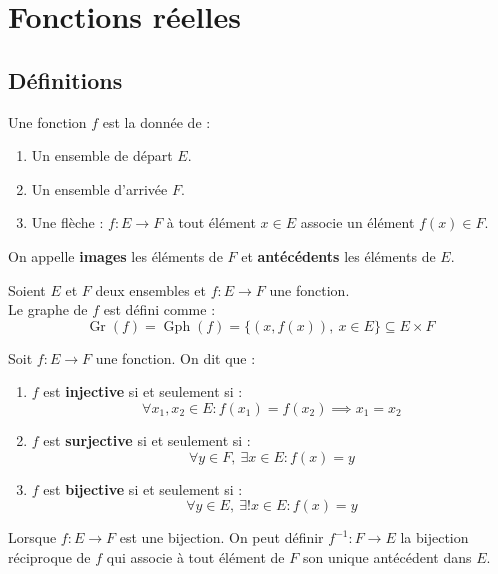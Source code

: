 \chapter{Fonctions réelles}
\def\arraystretch{1}

\section{Définitions}
\begin{definition}[Fonction]
	Une fonction $f$ est la donnée de :
	\begin{enumerate}
		\item Un ensemble de départ $E$.
		\item Un ensemble d'arrivée $F$.
		\item Une flèche : $ f : E \to F $ à tout élément $x \in E$ associe un élément $f(x) \in F$.
	\end{enumerate}		
	On appelle \textbf{images} les éléments de $F$ et \textbf{antécédents} les éléments de $E$.
\end{definition}

\begin{definition}
	Soient $E$ et $F$ deux ensembles et $f : E \longrightarrow F$ une fonction.
	\\
	Le graphe de $f$ est défini comme :
	\[ \operatorname{Gr}(f) = \operatorname{Gph}(f) = \{ (x, f(x)),\ x \in E \} \subseteq E \times F \] 
\end{definition}

\begin{definition}
	Soit $f : E \to F$ une fonction. On dit que :
    \begin{enumerate}
        \item $f$ est \textbf{injective} si et seulement si : 
        \[ \forall x_1, x_2 \in E : f(x_1) = f(x_2) \implies x_1 = x_2 \]
        \item $f$ est \textbf{surjective} si et seulement si : 
        \[ \forall y \in F,\ \exists x \in E : f(x) = y \]
        \item $f$ est \textbf{bijective} si et seulement si :
        \[ \forall y \in E,\ \exists ! x \in E : f(x) = y \]
    \end{enumerate}
\end{definition}

\begin{definition}
	Lorsque $f : E \longrightarrow F$ est une bijection. On peut définir $f^{-1} : F \to E$ la bijection réciproque de $f$ qui associe à tout élément de $F$ son unique antécédent dans $E$.
\end{definition}

